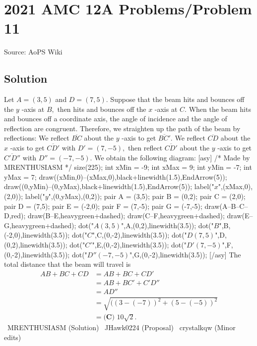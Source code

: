 \documentclass[12pt]{article}
\begin{document}
\section*{{2021 AMC 12A Problems/Problem 11}}
Source: AoPS Wiki

\subsection*{Solution}
Let $A=(3,5)$ and $D=(7,5).$ Suppose that the beam hits and bounces off the $y$ -axis at $B,$ then hits and bounces off the $x$ -axis at $C.$ When the beam hits and bounces off a coordinate axis, the angle of incidence and the angle of reflection are congruent. Therefore, we straighten up the path of the beam by reflections: We reflect $\overline{BC}$ about the $y$ -axis to get $\overline{BC'}.$ We reflect $\overline{CD}$ about the $x$ -axis to get $\overline{CD'}$ with $D'=(7,-5),$ then reflect $\overline{CD'}$ about the $y$ -axis to get $\overline{C'D''}$ with $D''=(-7,-5).$ We obtain the following diagram: [asy] /* Made by MRENTHUSIASM */ size(225); int xMin = -9; int xMax = 9; int yMin = -7; int yMax = 7; draw((xMin,0)--(xMax,0),black+linewidth(1.5),EndArrow(5)); draw((0,yMin)--(0,yMax),black+linewidth(1.5),EndArrow(5)); label("$x$",(xMax,0),(2,0)); label("$y$",(0,yMax),(0,2)); pair A = (3,5); pair B = (0,2); pair C = (2,0); pair D = (7,5); pair E = (-2,0); pair F = (7,-5); pair G = (-7,-5); draw(A--B--C--D,red); draw(B--E,heavygreen+dashed); draw(C--F,heavygreen+dashed); draw(E--G,heavygreen+dashed); dot("$A(3,5)$",A,(0,2),linewidth(3.5)); dot("$B$",B,(-2,0),linewidth(3.5)); dot("$C$",C,(0,-2),linewidth(3.5)); dot("$D(7,5)$",D,(0,2),linewidth(3.5)); dot("$C'$",E,(0,-2),linewidth(3.5)); dot("$D'(7,-5)$",F,(0,-2),linewidth(3.5)); dot("$D''(-7,-5)$",G,(0,-2),linewidth(3.5)); [/asy] The total distance that the beam will travel is \begin{align*} AB+BC+CD&=AB+BC+CD' \\ &=AB+BC'+C'D'' \\ &=AD'' \\ &=\sqrt{((3-(-7))^2+(5-(-5))^2} \\ &=\boxed{\textbf{(C) }10\sqrt2}. \end{align*} ~MRENTHUSIASM (Solution) ~JHawk0224 (Proposal) ~crystalkqw (Minor edits)
\end{document}
